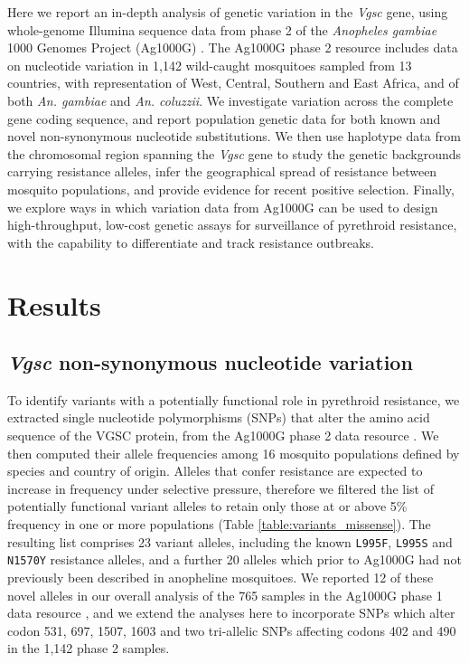 \documentclass[a4paper,11pt,abstracton,hidelinks]{scrartcl}
\begin{document}
Here we report an in-depth analysis of genetic variation in the \textit{Vgsc} gene, using whole-genome Illumina sequence data from phase 2 of the \emph{Anopheles gambiae} 1000 Genomes Project (Ag1000G) \cite{clarkson2019genome}.
%
The Ag1000G phase 2 resource includes data on nucleotide variation in 1,142 wild-caught mosquitoes sampled from 13 countries, with representation of West, Central, Southern and East Africa, and of both \textit{An. gambiae} and \textit{An. coluzzii}.
%
We investigate variation across the complete gene coding sequence, and report population genetic data for both known and novel non-synonymous nucleotide substitutions.
%
We then use haplotype data from the chromosomal region spanning the \textit{Vgsc} gene to study the genetic backgrounds carrying resistance alleles, infer the geographical spread of resistance between mosquito populations, and provide evidence for recent positive selection.
%
Finally, we explore ways in which variation data from Ag1000G can be used to design high-throughput, low-cost genetic assays for surveillance of pyrethroid resistance, with the capability to differentiate and track resistance outbreaks.




\section*{Results}


\subsection*{\textit{Vgsc} non-synonymous nucleotide variation}


%
To identify variants with a potentially functional role in pyrethroid resistance, we extracted single nucleotide polymorphisms (SNPs) that alter the amino acid sequence of the VGSC protein, from the Ag1000G phase 2 data resource \cite{clarkson2019genome}.
%
We then computed their allele frequencies among 16 mosquito populations defined by species and country of origin.
%
Alleles that confer resistance are expected to increase in frequency under selective pressure, therefore we filtered the list of potentially functional variant alleles to retain only those at or above 5\% frequency in one or more populations (Table \ref{table:variants_missense}).
%
The resulting list comprises 23 variant alleles, including the known \texttt{L995F}, \texttt{L995S} and \texttt{N1570Y} resistance alleles, and a further 20 alleles which prior to Ag1000G had not previously been described in anopheline mosquitoes.
%
We reported 12 of these novel alleles in our overall analysis of the 765 samples in the Ag1000G phase 1 data resource \cite{Ag1000gConsortium2017}, and we extend the analyses here to incorporate SNPs which alter codon 531, 697, 1507, 1603 and two tri-allelic SNPs affecting codons 402 and 490 in the 1,142 phase 2 samples.
\end{document}
